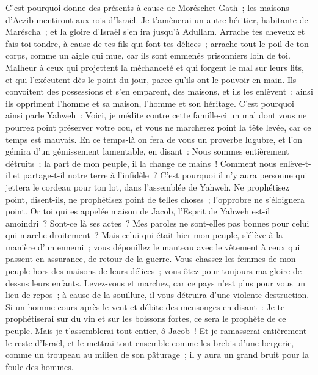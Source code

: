 \begin{multicols}{2}
C'est pourquoi donne des présents à cause de Moréschet-Gath~; les maisons d'Aczib mentiront aux rois d'Israël.
Je t'amènerai un autre héritier, habitante de Maréscha~; et la gloire d'Israël s'en ira jusqu'à Adullam.
Arrache tes cheveux et fais-toi tondre, à cause de tes fils qui font tes délices~; arrache tout le poil de ton corps, comme un aigle qui mue, car ils sont emmenés prisonniers loin de toi.
\VerseOne{}Malheur à ceux qui projettent la méchanceté et qui forgent le mal sur leurs lits, et qui l'exécutent dès le point du jour, parce qu'ils ont le pouvoir en main.
Ils convoitent des possessions et s'en emparent, des maisons, et ils les enlèvent~; ainsi ils oppriment l'homme et sa maison, l'homme et son héritage.
C'est pourquoi ainsi parle Yahweh~: Voici, je médite contre cette famille-ci un mal dont vous ne pourrez point préserver votre cou, et vous ne marcherez point la tête levée, car ce temps est mauvais.
En ce temps-là on fera de vous un proverbe lugubre, et l'on gémira d'un gémissement lamentable, en disant~: Nous sommes entièrement détruits~; la part de mon peuple, il la change de mains~! Comment nous enlève-t-il et partage-t-il notre terre à l'infidèle~?
C'est pourquoi il n'y aura personne qui jettera le cordeau pour ton lot, dans l'assemblée de Yahweh.
Ne prophétisez point, disent-ils, ne prophétisez point de telles choses~; l'opprobre ne s'éloignera point.
Or toi qui es appelée maison de Jacob, l'Esprit de Yahweh est-il amoindri~? Sont-ce là ses actes~? Mes paroles ne sont-elles pas bonnes pour celui qui marche droitement~?
Mais celui qui était hier mon peuple, s'élève à la manière d'un ennemi~; vous dépouillez le manteau avec le vêtement à ceux qui passent en assurance, de retour de la guerre.
Vous chassez les femmes de mon peuple hors des maisons de leurs délices~; vous ôtez pour toujours ma gloire de dessus leurs enfants.
Levez-vous et marchez, car ce pays n'est plus pour vous un lieu de repos~; à cause de la souillure, il vous détruira d'une violente destruction.
Si un homme cours après le vent et débite des mensonges en disant~: Je te prophétiserai sur du vin et sur les boissons fortes, ce sera le prophète de ce peuple.
Mais je t'assemblerai tout entier, ô Jacob~! Et je ramasserai entièrement le reste d'Israël, et le mettrai tout ensemble comme les brebis d'une bergerie, comme un troupeau au milieu de son pâturage~; il y aura un grand bruit pour la foule des hommes.

\end{multicols}
